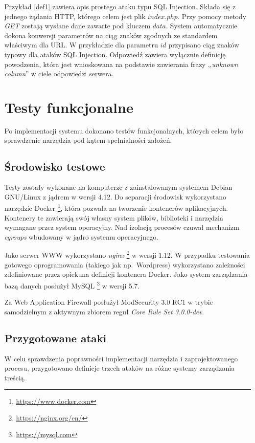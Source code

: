 \documentclass[11pt,a4paper,polish,thesis]{dcsbook}
\begin{document}
Przykład \ref{def1} zawiera opis prostego ataku typu SQL Injection. Składa się z jednego żądania HTTP, którego celem jest plik $index.php$. Przy pomocy metody \textit{GET} zostają wysłane dane zawarte pod kluczem $data$. System automatycznie dokona konwersji parametrów na ciąg znaków zgodnych ze standardem właściwym dla URL. W przykładzie dla parametru $id$ przypisano ciąg znaków typowy dla ataków SQL Injection.
Odpowiedź zawiera wyłącznie definicję powodzenia, która jest wnioskowana na podstawie zawierania frazy ,,\textit{unknown column}'' w ciele odpowiedzi serwera.


\chapter{Testy funkcjonalne}
Po implementacji systemu dokonano testów funkcjonalnych, których celem było sprawdzenie narzędzia pod kątem spełnialności założeń. 

\section{Środowisko testowe}
Testy zostały wykonane na komputerze z zainstalowanym systemem Debian GNU/Linux z jądrem w wersji 4.12. Do separacji środowisk wykorzystano narzędzie Docker \footnote{\url{https://www.docker.com}}, która pozwala na tworzenie kontenerów aplikacyjnych. Kontenery te zawierają swój własny system plików, biblioteki i narzędzia wymagane przez system operacyjny. Nad izolacją procesów czuwał mechanizm \textit{cgroups} wbudowany w jądro systemu operacyjnego.

Jako serwer WWW wykorzystano \textit{nginx} \footnote{\url{https://nginx.org/en/}} w wersji 1.12. W przypadku testowania gotowego oprogramowania (takiego jak np.~Wordpress) wykorzystano zależności zdefiniowane przez opiekuna definicji kontenera Docker. Jako system zarządzania bazą danych posłużył MySQL \footnote{\url{https://mysql.com}} w wersji 5.7.

Za Web Application Firewall posłużył ModSecurity 3.0 RC1 w trybie samodzielnym z aktywnym zbiorem reguł \textit{Core Rule Set 3.0.0-dev}.


\section{Przygotowane ataki}
W celu sprawdzenia poprawności implementacji narzędzia i zaprojektowanego procesu, przygotowano definicje trzech ataków na różne systemy zarządzania treścią. 
\end{document}
